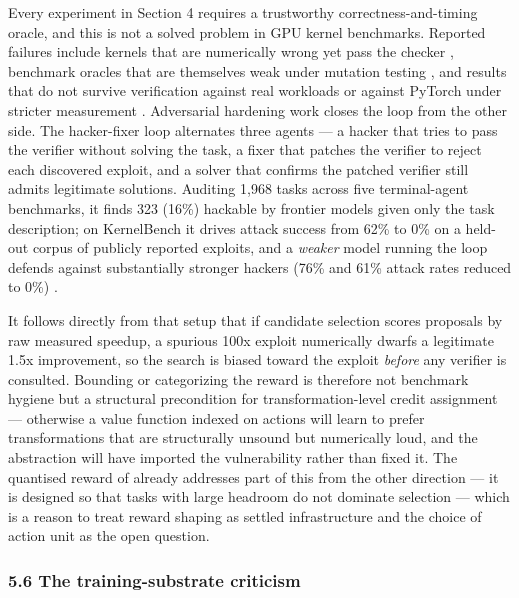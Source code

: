 \documentclass[
  11pt,
]{article}
\begin{document}
Every experiment in Section 4 requires a trustworthy correctness-and-timing oracle, and this is not a solved problem in GPU kernel benchmarks. Reported failures include kernels that are numerically wrong yet pass the checker \cite{the20}, benchmark oracles that are themselves weak under mutation testing \cite{measuring24}, and results that do not survive verification against real workloads or against PyTorch under stricter measurement \cite{kernelbenchverified22,are23,how25}. Adversarial hardening work closes the loop from the other side. The hacker-fixer loop alternates three agents --- a hacker that tries to pass the verifier without solving the task, a fixer that patches the verifier to reject each discovered exploit, and a solver that confirms the patched verifier still admits legitimate solutions. Auditing 1,968 tasks across five terminal-agent benchmarks, it finds 323 (16\%) hackable by frontier models given only the task description; on KernelBench it drives attack success from 62\% to 0\% on a held-out corpus of publicly reported exploits, and a \emph{weaker} model running the loop defends against substantially stronger hackers (76\% and 61\% attack rates reduced to 0\%) \cite{hardening19}.

It follows directly from that setup that if candidate selection scores proposals by raw measured speedup, a spurious 100x exploit numerically dwarfs a legitimate 1.5x improvement, so the search is biased toward the exploit \emph{before} any verifier is consulted. Bounding or categorizing the reward is therefore not benchmark hygiene but a structural precondition for transformation-level credit assignment --- otherwise a value function indexed on actions will learn to prefer transformations that are structurally unsound but numerically loud, and the abstraction will have imported the vulnerability rather than fixed it. The quantised reward of \cite{cuda1} already addresses part of this from the other direction --- it is designed so that tasks with large headroom do not dominate selection --- which is a reason to treat reward shaping as settled infrastructure and the choice of action unit as the open question.

\hypertarget{the-training-substrate-criticism}{%
\subsubsection{5.6 The training-substrate criticism}\label{the-training-substrate-criticism}}
\end{document}
